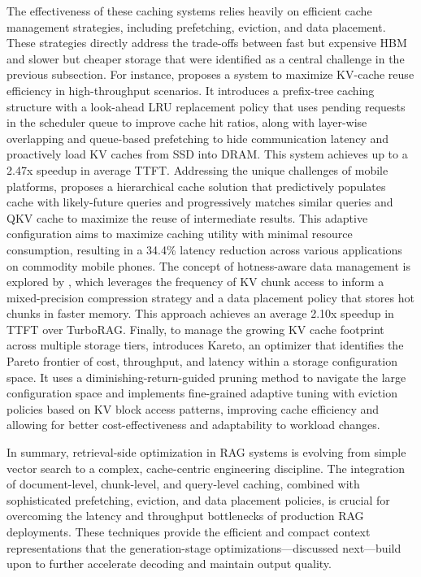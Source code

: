 \documentclass[11pt]{article}
\begin{document}
The effectiveness of these caching systems relies heavily on efficient cache management strategies, including prefetching, eviction, and data placement. These strategies directly address the trade-offs between fast but expensive HBM and slower but cheaper storage that were identified as a central challenge in the previous subsection. For instance, \cite{ref509} proposes a system to maximize KV-cache reuse efficiency in high-throughput scenarios. It introduces a prefix-tree caching structure with a look-ahead LRU replacement policy that uses pending requests in the scheduler queue to improve cache hit ratios, along with layer-wise overlapping and queue-based prefetching to hide communication latency and proactively load KV caches from SSD into DRAM. This system achieves up to a 2.47x speedup in average TTFT. Addressing the unique challenges of mobile platforms, \cite{ref522} proposes a hierarchical cache solution that predictively populates cache with likely-future queries and progressively matches similar queries and QKV cache to maximize the reuse of intermediate results. This adaptive configuration aims to maximize caching utility with minimal resource consumption, resulting in a 34.4\% latency reduction across various applications on commodity mobile phones. The concept of hotness-aware data management is explored by \cite{ref523}, which leverages the frequency of KV chunk access to inform a mixed-precision compression strategy and a data placement policy that stores hot chunks in faster memory. This approach achieves an average 2.10x speedup in TTFT over TurboRAG. Finally, to manage the growing KV cache footprint across multiple storage tiers, \cite{ref524} introduces Kareto, an optimizer that identifies the Pareto frontier of cost, throughput, and latency within a storage configuration space. It uses a diminishing-return-guided pruning method to navigate the large configuration space and implements fine-grained adaptive tuning with eviction policies based on KV block access patterns, improving cache efficiency and allowing for better cost-effectiveness and adaptability to workload changes.

In summary, retrieval-side optimization in RAG systems is evolving from simple vector search to a complex, cache-centric engineering discipline. The integration of document-level, chunk-level, and query-level caching, combined with sophisticated prefetching, eviction, and data placement policies, is crucial for overcoming the latency and throughput bottlenecks of production RAG deployments. These techniques provide the efficient and compact context representations that the generation-stage optimizations---discussed next---build upon to further accelerate decoding and maintain output quality.
\end{document}
